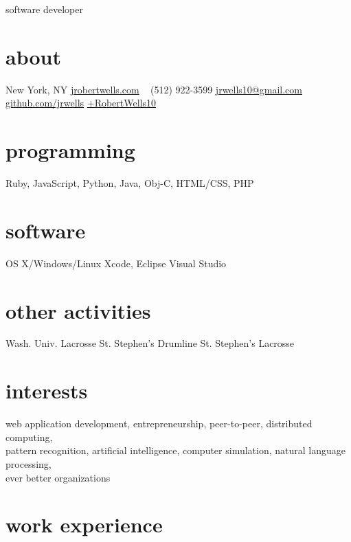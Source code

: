 \documentclass[]{cv}
\begin{document}
       {software developer}

\begin{aside}
  \section{about}
    {New York, NY}
    \href{http://jrobertwells.com}{jrobertwells.com}
    ~
    (512) 922-3599
    \href{mailto:jrwells10@gmail.com}{jrwells10@gmail.com}
    ~
    \href{http://github.com/jrwells}{github.com/jrwells}
    \href{http://google.com/+RobertWells10}{+RobertWells10}
  \section{programming}
    Ruby, JavaScript,
    Python, Java, Obj-C,
    HTML/CSS, PHP
  \section{software}
    OS X/Windows/Linux
    Xcode, Eclipse
    Visual Studio
  \section{other activities}
    Wash. Univ. Lacrosse
    St. Stephen's Drumline
    St. Stephen's Lacrosse
\end{aside}

\section{interests}

web application development, entrepreneurship, peer-to-peer, distributed computing, \\
pattern recognition, artificial intelligence, computer simulation, natural language processing, \\
ever better organizations

\section{work experience}
\end{document}
